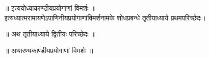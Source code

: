 \vspace{2mm}
\centering ॥ इत्ययोध्याकाण्डीयप्रयोगाणां विमर्शः ॥\nopagebreak\\
\vspace{4mm}
\centering इत्यध्यात्म\-रामायणेऽपाणिनीय\-प्रयोगाणां\-विमर्श\-नामके शोध\-प्रबन्धे तृतीयाध्याये प्रथम\-परिच्छेदः।\\
\pagebreak
{}
{}
\centering ॥ अथ तृतीयाध्याये द्वितीयः परिच्छेदः ॥\nopagebreak\\
\vspace{4mm}
{}
\centering ॥ अथारण्यकाण्डीयप्रयोगाणां विमर्शः ॥\nopagebreak\\

